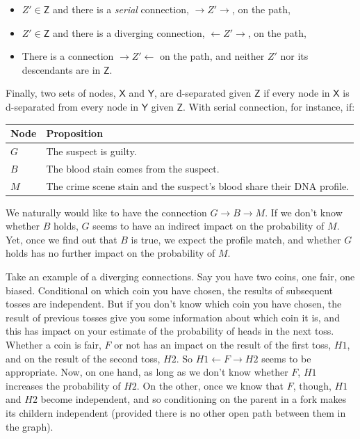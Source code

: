 \documentclass[
  10pt,
  dvipsnames,enabledeprecatedfontcommands]{scrartcl}
\begin{document}
\begin{itemize} 
\item $Z' \in \mathsf{Z}$ and there is a \emph{serial} connection, $\rightarrow Z' \rightarrow$, on the path,
\item  $Z'\in \mathsf{Z}$ and there is a diverging connection, $\leftarrow Z' \rightarrow $, on the path,
\item There is a connection $\rightarrow Z' \leftarrow$ on the path, and neither $Z'$ nor its descendants are in $\mathsf{Z}$.
\end{itemize}

\vspace{1mm}

Finally, two sets of nodes, \(\mathsf{X}\) and \(\mathsf{Y}\), are
d-separated given \(\mathsf{Z}\) if every node in \(\mathsf{X}\) is
d-separated from every node in \(\mathsf{Y}\) given \(\mathsf{Z}\). With
serial connection, for instance, if:

\footnotesize 
\begin{center}
\begin{tabular}{@{}lp{4.3cm}@{}}\toprule
Node & Proposition \\ \midrule 
$G$ & The suspect is guilty. \\
$B$ & The blood stain comes from the suspect.\\
$M$ & The crime scene stain and the suspect's blood share their DNA profile.\\
\bottomrule
\end{tabular}
\end{center}
\normalsize

\noindent We naturally would like to have the connection
\(G \rightarrow B \rightarrow M\). If we don't know whether \(B\) holds,
\(G\) seems to have an indirect impact on the probability of \(M\). Yet,
once we find out that \(B\) is true, we expect the profile match, and
whether \(G\) holds has no further impact on the probability of \(M\).

Take an example of a diverging connections. Say you have two coins, one
fair, one biased. Conditional on which coin you have chosen, the results
of subsequent tosses are independent. But if you don't know which coin
you have chosen, the result of previous tosses give you some information
about which coin it is, and this has impact on your estimate of the
probability of heads in the next toss. Whether a coin is fair, \(F\) or
not has an impact on the result of the first toss, \(H1\), and on the
result of the second toss, \(H2\). So \(H1 \leftarrow F \rightarrow H2\)
seems to be appropriate. Now, on one hand, as long as we don't know
whether \(F\), \(H1\) increases the probability of \(H2\). On the other,
once we know that \(F\), though, \(H1\) and \(H2\) become independent,
and so conditioning on the parent in a fork makes its childern
independent (provided there is no other open path between them in the
graph).
\end{document}
